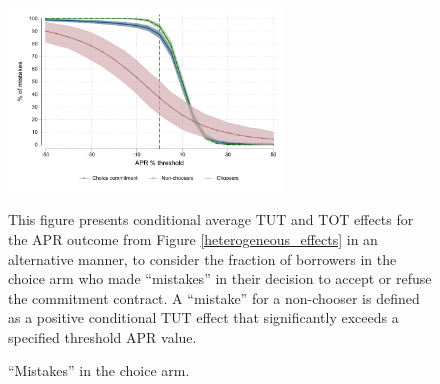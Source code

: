 \documentclass[12pt, a4paper]{article}
\begin{document}
\begin{figure}[H]
 \caption{``Mistakes'' in the choice arm.}
\begin{center}
        \centering
        \includegraphics[width=0.65\textwidth]{Figuras/line_cw_apr_tot_tut.pdf}
 \end{center}       
 \scriptsize{This figure presents conditional average TUT and TOT effects for the APR outcome from Figure \ref{heterogeneous_effects} in an alternative manner, to consider the fraction of borrowers in the choice arm who made ``mistakes'' in their decision to accept or refuse the commitment contract. A ``mistake'' for a non-chooser is defined as a positive conditional TUT effect that significantly exceeds a specified threshold APR value.
}
    \label{choose_wrong}
\end{figure}
\end{document}

